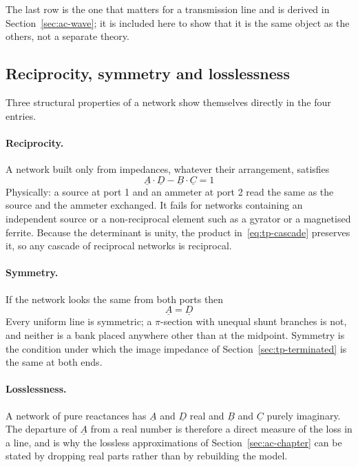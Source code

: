 The last row is the one that matters for a transmission line and is derived
in Section~\ref{sec:ac-wave}; it is included here to show that it is the
same object as the others, not a separate theory.

\subsection{Reciprocity, symmetry and losslessness}
\label{sec:tp-properties}

Three structural properties of a network show themselves directly in the
four entries.

\paragraph{Reciprocity.} A network built only from impedances, whatever
their arrangement, satisfies
\begin{equation}
  \underline{A} \cdot \underline{D} - \underline{B} \cdot \underline{C} = 1
  \label{eq:tp-reciprocity}
\end{equation}
Physically: a source at port 1 and an ammeter at port 2 read the same as the
source and the ammeter exchanged. It fails for networks containing an
independent source or a non-reciprocal element such as a gyrator or a
magnetised ferrite. Because the determinant is unity, the product
in~\eqref{eq:tp-cascade} preserves it, so any cascade of reciprocal
networks is reciprocal.

\paragraph{Symmetry.} If the network looks the same from both ports then
\begin{equation}
  \underline{A} = \underline{D}
  \label{eq:tp-symmetry}
\end{equation}
Every uniform line is symmetric; a $\pi$-section with unequal shunt branches
is not, and neither is a bank placed anywhere other than at the midpoint.
Symmetry is the condition under which the image impedance of
Section~\ref{sec:tp-terminated} is the same at both ends.

\paragraph{Losslessness.} A network of pure reactances has $\underline{A}$
and $\underline{D}$ real and $\underline{B}$ and $\underline{C}$ purely
imaginary. The departure of $\underline{A}$ from a real number is therefore
a direct measure of the loss in a line, and is why the lossless
approximations of Section~\ref{sec:ac-chapter} can be stated by dropping
real parts rather than by rebuilding the model.

